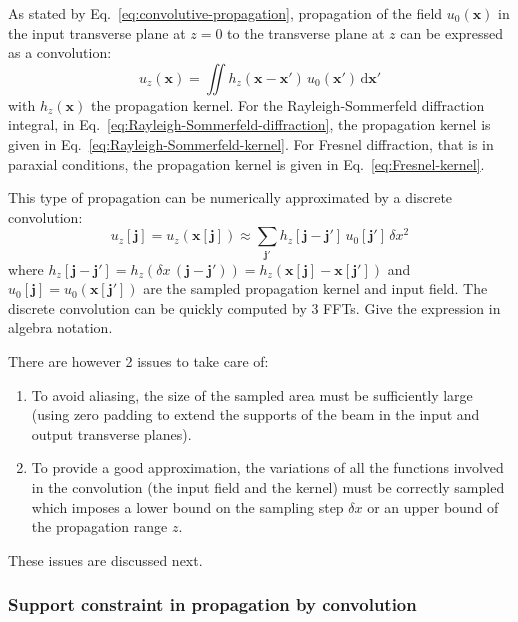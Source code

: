\documentclass[a4paper]{article}
\newcommand{\oops}[1]{{\color{purple}#1}}
\newcommand*{\V}[1]{\boldsymbol{#1}}
\newcommand*{\mathd}{\mathrm{d}}
\begin{document}
As stated by Eq.~\eqref{eq:convolutive-propagation}, propagation of the field
$u_{0}(\V{x})$ in the input transverse plane at $z=0$ to the transverse plane
at $z$ can be expressed as a convolution:
\begin{equation}
  u_{z}(\V{x}) =
  \iint h_{z}(\V{x} - \V{x}')\, u_{0}(\V{x}')\,\mathd\V{x}'
\end{equation}
with $h_{z}(\V{x})$ the propagation kernel. For the Rayleigh-Sommerfeld
diffraction integral, in Eq.~\eqref{eq:Rayleigh-Sommerfeld-diffraction}, the
propagation kernel is given in Eq.~\eqref{eq:Rayleigh-Sommerfeld-kernel}. For
Fresnel diffraction, that is in paraxial conditions, the propagation kernel is
given in Eq.~\eqref{eq:Fresnel-kernel}.

This type of propagation can be numerically approximated by a discrete
convolution:
\begin{equation}
  \label{eq:discrete-convolution}
  u_{z}[\V{j}] = u_{z}(\V{x}[\V{j}])
  ≈ \sum_{\V{j}'}h_{z}[\V{j} - \V{j}']\,u_{0}[\V{j}']\,δx^{2}
\end{equation}
where
$h_{z}[\V{j} - \V{j}'] = h_{z}(δx\,(\V{j} - \V{j}')) = h_{z}(\V{x}[\V{j}] - \V{x}[\V{j}'])$
and $u_{0}[\V{j}] = u_{0}(\V{x}[\V{j}'])$ are the sampled propagation kernel
and input field. The discrete convolution can be quickly computed by 3 FFTs.
\oops{Give the expression in algebra notation.}

There are however 2 issues to take care of:
\begin{enumerate}
\item To avoid aliasing, the size of the sampled area must be sufficiently
      large (using zero padding to extend the supports of the beam in the input
      and output transverse planes).
\item To provide a good approximation, the variations of all the functions
      involved in the convolution (the input field and the kernel) must be
      correctly sampled which imposes a lower bound on the sampling step $δx$
      or an upper bound of the propagation range $z$.
\end{enumerate}

These issues are discussed next.

\subsubsection{Support constraint in propagation by convolution}
\end{document}
